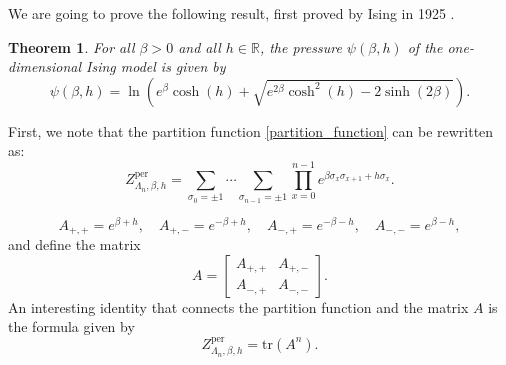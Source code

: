 \documentclass[11pt]{book}
\newtheorem{theorem}{Theorem}
\begin{document}
We are going to prove the following result, first proved by Ising in 1925 \cite{Ising}.

\begin{theorem}\label{Ising}
For all $\beta > 0$ and all $h \in \mathbb{R}$, the pressure $\psi(\beta,h)$ of the one-dimensional Ising model is given by
\begin{equation}\label{pressure_1d_ising}
\psi(\beta,h) = \ln \left( e^{\beta} \cosh(h) + \sqrt{e^{2\beta} \cosh^2(h) - 2 \sinh(2\beta)} \right).
\end{equation}
\end{theorem}

First, we note that the partition function \eqref{partition_function} can be rewritten as:
\begin{equation}\label{partition_function1}
Z^{\text{per}}_{\Lambda_n,\beta,h} = \sum_{\sigma_0=\pm 1}\cdots \sum_{\sigma_{n-1}=\pm 1} \prod_{x=0}^{n-1} e^{\beta \sigma_x \sigma_{x+1} + h \sigma_x}.
\end{equation}


$$
A_{+,+} = e^{\beta + h}, \quad A_{+,-} = e^{-\beta + h}, \quad A_{-,+} = e^{-\beta - h}, \quad A_{-,-} = e^{\beta - h},
$$
and define the matrix
$$
A = \begin{bmatrix}
A_{+,+} & A_{+,-} \\
A_{-,+} & A_{-,-}
\end{bmatrix}.
$$
An interesting identity that connects the partition function and the matrix $A$ is the formula given by
\begin{equation}\label{trAn}
Z^{\text{per}}_{\Lambda_n,\beta,h} = \text{tr}(A^n).
\end{equation}
\end{document}
